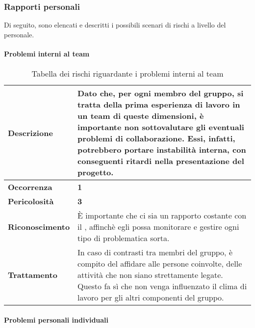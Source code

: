 \subsubsection{Rapporti personali}

Di seguito, sono elencati e descritti i possibili scenari di rischi a livello del personale.

\paragraph{Problemi interni al team}

\begin{table}[H]
	\begin{center}
		\begin{tabular}{|l | p{11cm}|}
			\hline
			\textbf{Descrizione}	& Dato che, per ogni membro del gruppo, si tratta della prima esperienza di lavoro in un team di queste dimensioni, è importante non sottovalutare gli eventuali problemi di collaborazione. Essi, infatti, potrebbero portare instabilità interna, con conseguenti ritardi nella presentazione del progetto. \\
			\hline
			\textbf{Occorrenza}	&	\textbf{1}	\\
			\hline
			\textbf{Pericolosità}	&	\textbf{3}	\\
			\hline
			\textbf{Riconoscimento}	& \MakeUppercase{è} importante che ci sia un rapporto costante con il \textit{\RdP}, affinchè egli possa monitorare e gestire ogni tipo di problematica sorta.	\\
			\hline
			\textbf{Trattamento}	&	In caso di contrasti tra membri del gruppo, è compito del \textit{\RdP} affidare alle persone coinvolte, delle attività che non siano strettamente legate. Questo fa sì che non venga influenzato il clima di lavoro per gli altri componenti del gruppo.	\\
			\hline
		\end{tabular}
		\caption{Tabella dei rischi riguardante i problemi interni al team}
	\end{center}
\end{table}

\paragraph{Problemi personali individuali}

